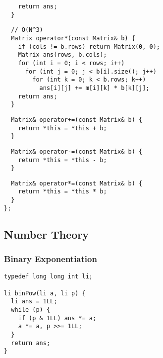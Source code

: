 \documentclass[twoside]{article}
\begin{document}
\begin{multicols*}{2}
\begin{verbatim}
    return ans;
  }
\end{verbatim}
\vspace{-12pt}
\begin{verbatim}
  // O(N^3)
  Matrix operator*(const Matrix& b) {
    if (cols != b.rows) return Matrix(0, 0);
    Matrix ans(rows, b.cols);
    for (int i = 0; i < rows; i++)
      for (int j = 0; j < b[i].size(); j++)
        for (int k = 0; k < b.rows; k++)
          ans[i][j] += m[i][k] * b[k][j];
    return ans;
  }
\end{verbatim}
\vspace{-12pt}
\begin{verbatim}
  Matrix& operator+=(const Matrix& b) {
    return *this = *this + b;
  }
\end{verbatim}
\vspace{-12pt}
\begin{verbatim}
  Matrix& operator-=(const Matrix& b) {
    return *this = *this - b;
  }
\end{verbatim}
\vspace{-12pt}
\begin{verbatim}
  Matrix& operator*=(const Matrix& b) {
    return *this = *this * b;
  }
};
\end{verbatim}

\subsectionfont{\bfseries\sffamily\centering\LARGE}
\vspace{0em}
\subsection*{Number Theory}
\vspace{2em}
\subsubsectionfont{\large\bfseries\sffamily\underline}
\subsubsection*{Binary Exponentiation}
\begin{verbatim}
typedef long long int li;

li binPow(li a, li p) {
  li ans = 1LL;
  while (p) {
    if (p & 1LL) ans *= a;
    a *= a, p >>= 1LL;
  }
  return ans;
}
\end{verbatim}

\subsubsectionfont{\large\bfseries\sffamily\underline}

\end{multicols*}
\end{document}
